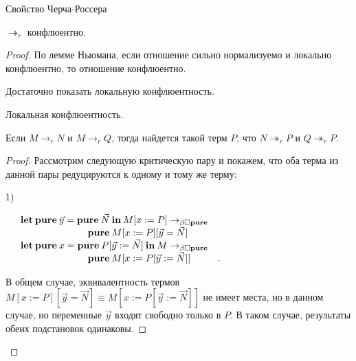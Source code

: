 \begin{theorem} Свойство Черча-Россера
$ $

$\twoheadrightarrow_{r}$ конфлюентно.
\end{theorem}

\begin{proof}

  По лемме Ньюмана, если отношение сильно нормализуемо и локально конфлюентно, то отношение конфлюентно.

Достаточно показать локальную конфлюентность.

\begin{lemma} Локальная конфлюентность.

Если $M \rightarrow_{r} N$ и $M \rightarrow_{r} Q$, тогда найдется такой терм $P$,
что $N \twoheadrightarrow_{r} P$ и $Q \twoheadrightarrow_{r} P$.

\end{lemma}

\begin{proof}

Рассмотрим следующую критическую пару и покажем, что оба терма из данной пары редуцируются к одному и тому же терму:


1) 

$\begin{array}{lll}
&{\bf let \: pure \:} \vec{y} = {\bf pure \:} \vec{N} {\: \bf in \:} M [x := P] \rightarrow_{\beta \Box {\bf pure}}& \\
&\quad\quad\quad\quad\quad\quad\quad {\bf pure \:} M [x := P] [\vec{y} = \vec{N}]& \\
&{\bf let \: pure \:} x = {\bf pure \:} P [\vec{y} := \vec{N}] {\: \bf in \:} M \rightarrow_{\beta \Box {\bf pure}}& \\
&\quad\quad\quad\quad\quad\quad\quad {\bf pure \:} M [x := P[\vec{y} := \vec{N}]]&.
\end{array}$


В общем случае, эквивалентность термов $M [x := P] [\vec{y} = \vec{N}] \equiv M [x := P[\vec{y} := \vec{N}]]$ не имеет места,
но в данном случае, но переменные $\vec{y}$ входят свободно только в $P$. В таком случае, результаты обеих подстановок одинаковы.
\end{proof}
\end{proof}

